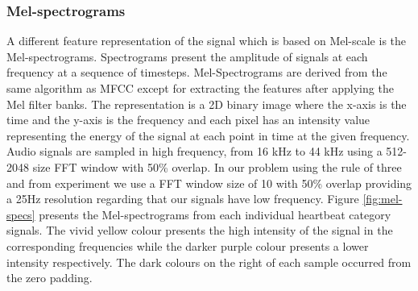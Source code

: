 \documentclass[a4paper,10pt,twocolumn]{article}
\begin{document}
\subsubsection{Mel-spectrograms}
\label{sec:spectograms}
A different feature representation of the signal which is based on Mel-scale is the Mel-spectrograms. Spectrograms present the amplitude of signals at each frequency at a sequence of timesteps. Mel-Spectrograms are derived from the same algorithm as MFCC except for extracting the features after applying the Mel filter banks. The representation is a 2D binary image where the x-axis is the time and the y-axis is the frequency and each pixel has an intensity value representing the energy of the signal at each point in time at the given frequency. Audio signals are sampled in high frequency, from 16 kHz to 44 kHz using a 512-2048 size FFT window with 50\% overlap. In our problem using the rule of three and from experiment we use a FFT window size of 10 with 50\% overlap providing a 25Hz resolution regarding that our signals have low frequency. Figure \ref{fig:mel-specs} presents the Mel-spectrograms from each individual heartbeat category signals. The vivid yellow colour presents the high intensity of the signal in the corresponding frequencies while the darker purple colour presents a lower intensity respectively. The dark colours on the right of each sample occurred from the zero padding. 

\end{document}
